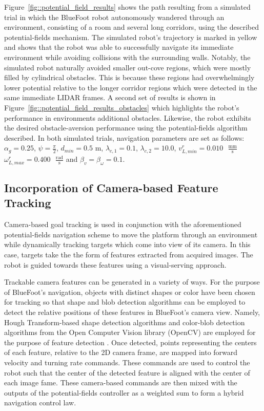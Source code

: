 			Figure~\ref{fig::potential_field_results} shows the path resulting from a simulated trial in which the BlueFoot robot autonomously wandered through an environment, consisting of a room and several long corridors, using the described potential-fields mechanism. The simulated robot's trajectory is marked in yellow and shows that the robot was able to successfully navigate its immediate environment while avoiding collisions with the surrounding walls. Notably, the simulated robot naturally avoided smaller out-cove regions, which were mostly filled by cylindrical obstacles. This is because these regions had overwhelmingly lower potential relative to the longer corridor regions which were detected in the same immediate LIDAR frames. A second set of results is shown in Figure~\ref{fig::potential_field_results_obstacles} which highlights the robot's performance in environments additional obstacles. Likewise, the robot exhibits the desired obstacle-aversion performance using the potential-fields algorithm described. In both simulated trials, navigation parameters are set as follows: 
				$\alpha_{g}=0.25$,
				$\psi=\frac{\pi}{2}$,
				$d_{min}=0.5\text{ m}$,
				$\lambda_{c,1}=0.1$,
				$\lambda_{c,2}=10.0$, 
				$v_{L,min}^{r}=0.010\text{ }\frac{\text{mm}}{\text{s}}$
				$\omega_{L,max}^{r}=0.400\text{ }\frac{\text{rad}}{\text{s}}$
				and
				$\beta_{v}=\beta_{\omega}=0.1$.


		\subsection{Incorporation of Camera-based Feature Tracking}
		
			Camera-based goal tracking is used in conjunction with the aforementioned potential-fields navigation scheme to move the platform through an environment while dynamically tracking targets which come into view of its camera. In this case, targets take the the form of features extracted from acquired images. The robot is guided towards these features using a visual-serving approach. 

			Trackable camera features can be generated in a variety of ways. For the purpose of BlueFoot's navigation, objects with distinct shapes or color have been chosen for tracking so that shape and blob detection algorithms can be employed to detect the relative positions of these features in BlueFoot's camera view. Namely, Hough Transform-based shape detection algorithms and color-blob detection algorithms from the Open Computer Vision library (OpenCV) are employed for the purpose of feature detection \cite{opencv_library}. Once detected, points representing the centers of each feature, relative to the 2D camera frame, are mapped into forward velocity and turning rate commands. These commands are used to control the robot such that the center of the detected feature is aligned with the center of each image fame. These camera-based commands are then mixed with the outputs of the potential-fields controller as a weighted sum to form a hybrid navigation control law.


